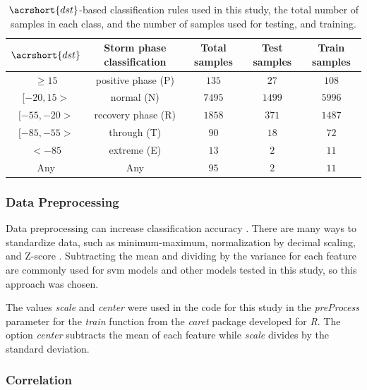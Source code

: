 \documentclass[sn-mathphys-num]{sn-jnl}%
\begin{document}
\begin{table}[!ht]
    \centering
    \caption{$\acrshort{dst}$-based classification rules used in this study, the total number of samples in each class, and the number of samples used for testing, and training.}
    \label{tab:Dstranges}
    \begin{tabular}{|c|c|c|c|c|}
        \hline
        $\acrshort{dst}$ & Storm phase classification & Total samples & Test samples & Train samples \\ \hline
        $ \geq 15 $ & positive phase (P) & $135$ & $27$ & $108$ \\ \hline
        $[-20, 15>$ & normal (N) & $7495$ & $1499$ & $5996$ \\ \hline
        $[-55, -20>$ & recovery phase (R) & $1858$ & $371$ & $1487$ \\ \hline
        $[-85, -55>$ & through (T) & $90$ & $18$ & $72$ \\ \hline
        $ < -85$ & extreme (E) & $13$ & $2$ & $11$ \\ \hline
        Any & Any & $95$ & $2$ & $11$ \\ \hline
    \end{tabular}
\end{table}

\subsubsection{Data Preprocessing}

Data preprocessing can increase classification accuracy \cite{Fan2008}. There are many ways to standardize data, such as minimum-maximum, normalization by decimal scaling, and Z-score \cite{Mohamad2013}. Subtracting the mean and dividing by the variance for each feature are commonly used for \acrshort{svm} models \cite{Fennell2019} and other models tested in this study, so this approach was chosen. 

The values \textit{scale} and \textit{center} were used in the code for this study in the \textit{preProcess} parameter for the \textit{train} function from the \textit{caret} package developed for \textit{R}. The option \textit{center} subtracts the mean of each feature while \textit{scale} divides by the standard deviation.

\subsubsection{Correlation}
\end{document}
